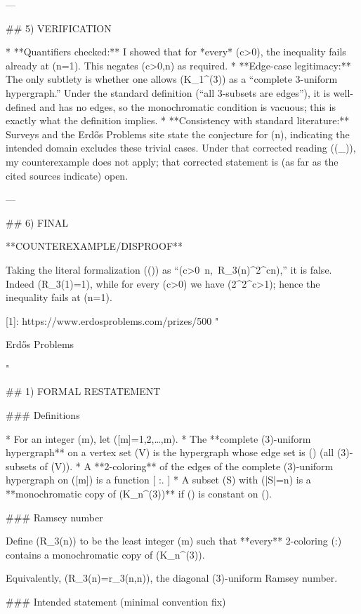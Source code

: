 ---

## 5) VERIFICATION

* **Quantifiers checked:** I showed that for *every* (c>0), the inequality fails already at (n=1). This negates (\exists c>0,\forall n) as required.
* **Edge-case legitimacy:** The only subtlety is whether one allows (K_1^{(3)}) as a “complete 3-uniform hypergraph.” Under the standard definition (“all 3-subsets are edges”), it is well-defined and has no edges, so the monochromatic condition is vacuous; this is exactly what the definition implies.
* **Consistency with standard literature:** Surveys and the Erdős Problems site state the conjecture for (n), indicating the intended domain excludes these trivial cases. 
  Under that corrected reading ((\star_{})), my counterexample does not apply; that corrected statement is (as far as the cited sources indicate) open.

---

## 6) FINAL

**COUNTEREXAMPLE/DISPROOF**

Taking the literal formalization ((\star)) as “(\exists c>0\ \forall n,\ R_3(n)^{2^{cn}}),” it is false.
Indeed (R_3(1)=1), while for every (c>0) we have (2^{2^{c}}>1); hence the inequality fails at (n=1).

[1]: https://www.erdosproblems.com/prizes/500 "
  
    Erdős Problems
  
"

## 1) FORMAL RESTATEMENT

### Definitions

* For an integer (m), let ([m]={1,2,\dots,m}).
* The **complete (3)-uniform hypergraph** on a vertex set (V) is the hypergraph whose edge set is () (all (3)-subsets of (V)).
* A **2-coloring** of the edges of the complete (3)-uniform hypergraph on ([m]) is a function
  [
  \chi:.
  ]
* A subset (S\subseteq [m]) with (|S|=n) is a **monochromatic copy of (K_n^{(3)})** if (\chi) is constant on ().

### Ramsey number

Define (R_3(n)) to be the least integer (m) such that **every** 2-coloring (\chi:) contains a monochromatic copy of (K_n^{(3)}).

Equivalently, (R_3(n)=r_3(n,n)), the diagonal (3)-uniform Ramsey number.

### Intended statement (minimal convention fix)

